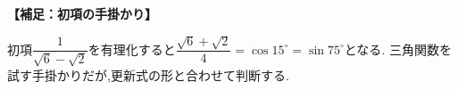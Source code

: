   \medskip
  \noindent \textbf{【補足：初項の手掛かり】}

  初項$\dfrac{1}{\sqrt6-\sqrt2}$を有理化すると$\dfrac{\sqrt6+\sqrt2}{4}=\cos15^\circ=\sin75^\circ$となる.
  三角関数を試す手掛かりだが,更新式の形と合わせて判断する.
  \par
  \endgroup


